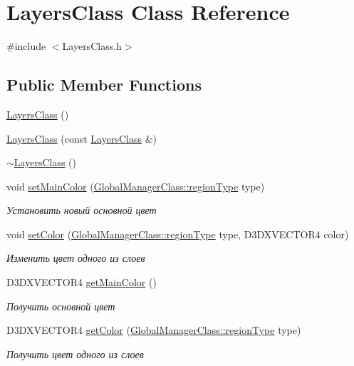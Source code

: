 \hypertarget{class_layers_class}{}\section{Layers\+Class Class Reference}
\label{class_layers_class}


{\ttfamily \#include $<$Layers\+Class.\+h$>$}

\subsection*{Public Member Functions}
\begin{DoxyCompactItemize}
\item 
\hyperlink{class_layers_class_af810e55733298ce7f0af317097a3b211}{Layers\+Class} ()
\item 
\hyperlink{class_layers_class_a7fad3b0ac037e648a73a7483fd2f6905}{Layers\+Class} (const \hyperlink{class_layers_class}{Layers\+Class} \&)
\item 
\hyperlink{class_layers_class_a8420a9854d542d9a34f23f14635b802f}{$\sim$\+Layers\+Class} ()
\item 
void \hyperlink{class_layers_class_a03363d17a4b5f689bc7e44b835b32e57}{set\+Main\+Color} (\hyperlink{class_global_manager_class_a794b4a5298c61f8d25d9da44b7826857}{Global\+Manager\+Class\+::region\+Type} type)
\begin{DoxyCompactList}\small\item\em Установить новый основной цвет \end{DoxyCompactList}\item 
void \hyperlink{class_layers_class_a9d8b522b952bd21c7db0041e59606642}{set\+Color} (\hyperlink{class_global_manager_class_a794b4a5298c61f8d25d9da44b7826857}{Global\+Manager\+Class\+::region\+Type} type, D3\+D\+X\+V\+E\+C\+T\+O\+R4 color)
\begin{DoxyCompactList}\small\item\em Изменить цвет одного из слоев \end{DoxyCompactList}\item 
D3\+D\+X\+V\+E\+C\+T\+O\+R4 \hyperlink{class_layers_class_ae998b7670e1ed3efb0d561711444a455}{get\+Main\+Color} ()
\begin{DoxyCompactList}\small\item\em Получить основной цвет \end{DoxyCompactList}\item 
D3\+D\+X\+V\+E\+C\+T\+O\+R4 \hyperlink{class_layers_class_ad116b43781c2fd810b483be9f68b43ee}{get\+Color} (\hyperlink{class_global_manager_class_a794b4a5298c61f8d25d9da44b7826857}{Global\+Manager\+Class\+::region\+Type} type)
\begin{DoxyCompactList}\small\item\em Получить цвет одного из слоев \end{DoxyCompactList}\end{DoxyCompactItemize}
